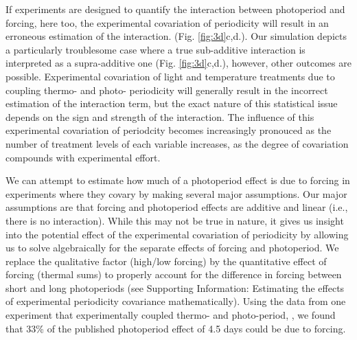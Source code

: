 \documentclass[11pt]{article}
\begin{document}
If experiments are designed to quantify the interaction between photoperiod and forcing, here too, the experimental covariation of periodicity will result in an erroneous estimation of the interaction. (Fig. \ref{fig:3d}c,d.). Our simulation depicts a particularly troublesome case where a true sub-additive interaction is interpreted as a supra-additive one (Fig. \ref{fig:3d}c,d.), however, other outcomes are possible. Experimental covariation of light and temperature treatments due to coupling thermo- and photo- periodicity will generally result in the incorrect estimation of the interaction term, but the exact nature of this statistical issue depends on the sign and strength of the interaction. The influence of this experimental covariation of periodcity becomes increasingly pronouced as the number of treatment levels of each variable increases, as the degree of covariation compounds with experimental effort. 
%

We can attempt to estimate how much of a photoperiod effect is due to forcing in experiments where they covary by making several major assumptions. Our major assumptions are that forcing and photoperiod effects are additive and linear (i.e., there is no interaction). While this may not be true in nature, it gives us insight into the potential effect of the experimental covariation of periodicity by allowing us to solve algebraically for the separate effects of forcing and photoperiod. We replace the qualitative factor (high/low forcing) by the quantitative effect of forcing (thermal sums) to properly account for the difference in forcing between short and long photoperiods (see Supporting Information: Estimating the effects of experimental periodicity covariance mathematically). Using the data from one experiment that experimentally coupled thermo- and photo-period, \citet{Flynn2018}, we found that 33\% of the published photoperiod effect of 4.5 days could be due to forcing. 
\end{document}
